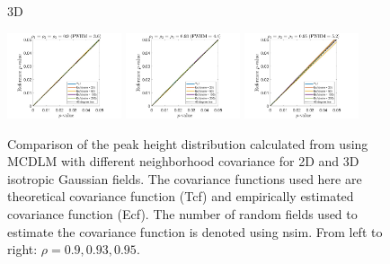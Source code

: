\documentclass{article}
\begin{document}
\begin{figure}[!htp]
\begin{sideways}
\phantom{------------------}3D
\end{sideways}
\includegraphics[trim=80 5 80 5, clip,width=0.3\textwidth]{figure/3D_rho1_0.9_rho2_0.9.jpg}
\includegraphics[trim=80 5 80 5, clip,width=0.3\textwidth]{figure/3D_rho1_0.93_rho2_0.93.jpg}
\includegraphics[trim=80 5 80 5, clip,width=0.3\textwidth]{figure/3D_rho1_0.95_rho2_0.95.jpg}
\caption{Comparison of the peak height distribution calculated from using MCDLM with different neighborhood covariance for 2D and 3D isotropic Gaussian fields. The covariance functions used here are theoretical covariance function (Tcf) and empirically estimated covariance function (Ecf). The number of random fields used to estimate the covariance function is denoted using nsim. From left to right: $\rho = 0.9, 0.93, 0.95$. \label{fig.appendix.d5}}
\end{figure}

\clearpage
\end{document}
